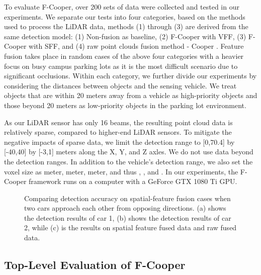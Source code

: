 \documentclass[sigconf]{acmart}
\begin{document}
To evaluate F-Cooper, over 200 sets of data were collected and tested in our experiments. We separate our tests into four categories, based on the methods used to process the LiDAR data, methods (1) through (3) are derived from the same detection model: (1) Non-fusion as baseline, (2) F-Cooper with VFF, (3) F-Cooper with SFF, and (4) raw point clouds fusion method - Cooper \cite{qi2019cooper}.
Feature fusion takes place in random cases of the above four categories with a heavier focus on busy campus parking lots as it is the most difficult scenario due to significant occlusions.
Within each category, we further divide our experiments by considering the distances between objects and the sensing vehicle.
We treat objects that are within 20 meters away from a vehicle as high-priority objects and those beyond 20 meters as low-priority objects in the parking lot environment. 

As our LiDAR sensor has only 16 beams, the resulting point cloud data is relatively sparse, compared to  higher-end LiDAR sensors. 
To mitigate the negative impacts of sparse data, we limit the detection range to [0,70.4] by [-40,40] by [-3,1] meters along the X, Y, and Z axles.
We do not use data beyond the detection ranges. 
In addition to the vehicle's detection range, we also set the voxel size as  meter,  meter,  meter, and thus , , and . 
In our experiments, the F-Cooper framework runs on a computer with a GeForce GTX 1080 Ti GPU.

\begin{figure*}[!htbp]
\centering
\vspace{-11pt}
\vfill
\caption{Comparing detection accuracy on spatial-feature fusion cases when two cars approach each other from opposing directions. (a) shows the detection results of car 1, (b) shows the detection results of car 2, while (c) is the results on spatial feature fused data and raw fused data.}
\vspace{-5pt}
\label{fig:lidar_detect2}
\end{figure*}



\subsection{\textbf{Top-Level Evaluation of F-Cooper}}
\end{document}
